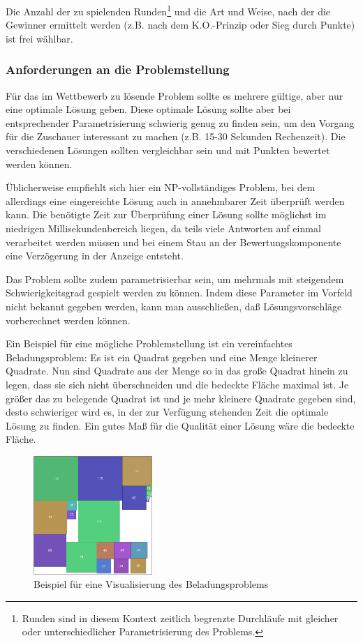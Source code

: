 \documentclass[a4paper, 12pt]{article}
\begin{document}
Die Anzahl der zu spielenden Runden\footnote{Runden sind in diesem Kontext
zeitlich begrenzte Durchläufe mit gleicher oder unterschiedlicher
Parametrisierung des Problems.} und die Art und Weise, nach der
die Gewinner ermittelt werden (z.B. nach dem K.O.-Prinzip oder Sieg durch
Punkte) ist frei wählbar.

\subsubsection{Anforderungen an die Problemstellung}

Für das im Wettbewerb zu lösende Problem sollte es mehrere gültige, aber nur
eine optimale Lösung geben. Diese optimale Lösung sollte aber bei entsprechender
Parametrisierung schwierig genug zu finden sein, um den Vorgang für die
Zuschauer interessant zu machen (z.B. 15-30 Sekunden Rechenzeit).
Die verschiedenen Lösungen sollten vergleichbar sein und mit Punkten bewertet
werden können.

Üblicherweise empfiehlt sich hier ein NP-vollständiges Problem, bei dem
allerdings eine eingereichte Lösung auch in annehmbarer Zeit überprüft werden
kann.
Die benötigte Zeit zur Überprüfung einer Lösung sollte möglichst im niedrigen
Millisekundenbereich liegen, da teils viele Antworten auf einmal verarbeitet
werden müssen und bei einem Stau an der Bewertungskomponente eine Verzögerung
in der Anzeige entsteht.

Das Problem sollte zudem parametrisierbar sein, um mehrmals mit steigendem
Schwie\-rig\-keits\-grad gespielt werden zu können.
Indem diese Parameter im Vorfeld nicht bekannt gegeben werden, kann man
ausschließen, daß Lösungsvorschläge vorberechnet werden können.

Ein Beispiel für eine mögliche Problemstellung ist ein vereinfachtes
Beladungsproblem:
Es ist ein Quadrat gegeben und eine Menge kleinerer Quadrate. Nun sind Quadrate
aus der Menge so in das große Quadrat hinein zu legen, dass sie sich nicht
überschneiden und die bedeckte Fläche maximal ist.
Je größer das zu belegende Quadrat ist und je mehr kleinere Quadrate gegeben
sind, desto schwieriger wird es, in der zur Verfügung stehenden Zeit die
optimale Lösung zu finden.
Ein gutes Maß für die Qualität einer Lösung wäre die bedeckte Fläche.

\begin{figure}[ht]
  \centering
  \includegraphics[width=0.4\textwidth]{squares}
  \caption{Beispiel für eine Visualisierung des Beladungsproblems}
\end{figure}
\end{document}
